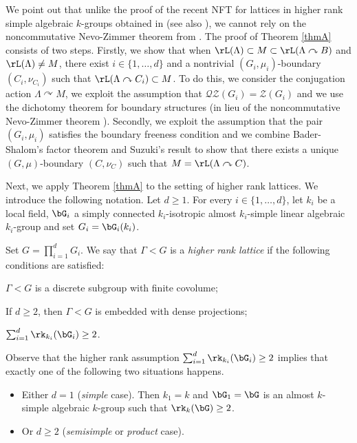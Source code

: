 We point out that unlike the proof of the recent NFT for lattices in higher rank simple algebraic $k$-groups obtained in \cite{BBH21} (see also \cite{Ho21}), we cannot rely on the noncommutative Nevo-Zimmer theorem from \cite{BH19, BBH21}. The proof of Theorem \ref{thmA} consists of two steps. Firstly, we show that when $\rL(\Lambda) \subset M \subset \rL(\Lambda \curvearrowright B)$ and $\rL(\Lambda) \neq M$, there exist $i \in \{1, \dots, d\}$ and a nontrivial $(G_i, \mu_i)$-boundary $(C_i, \nu_{C_i})$ such that $\rL(\Lambda \curvearrowright C_i) \subset M$. To do this, we consider the conjugation action $\Lambda \curvearrowright M$, we exploit the assumption that $\mathscr{Q}\mathscr{Z}(G_i) = \mathscr Z(G_i)$ and we use the dichotomy theorem for boundary structures \cite[Th.\,5.8]{BBHP20} (in lieu of the noncommutative Nevo-Zimmer theorem \cite{BH19, BBH21}). Secondly, we exploit the assumption that the pair $(G_i, \mu_i)$ satisfies the boundary freeness condition and we combine Bader-Shalom's factor theorem \cite{BS04} and Suzuki's result \cite{Su18} to show that there exists a unique $(G, \mu)$-boundary $(C, \nu_C)$ such that $M = \rL(\Lambda \curvearrowright C)$.

Next, we apply Theorem \ref{thmA} to the setting of higher rank lattices. We introduce the following notation. Let $d \geq 1$. For every $i \in \{1, \dots, d\}$, let $k_i$ be a local field, $\bG_i$ a simply connected $k_i$-isotropic almost $k_i$-simple linear algebraic $k_i$-group and set $G_i = \bG_i(k_i)$.

\begin{definition}
Set $G = \prod_{i = 1}^d G_i$. We say that $\Gamma < G$ is a \emph{higher rank lattice} if the following conditions are satisfied:
\begin{enumeratei}
\item
$\Gamma < G$ is a discrete subgroup with finite covolume;
\item
If $d \geq 2$, then $\Gamma < G$ is embedded with dense projections;
\item
$\sum_{i = 1}^d \rk_{k_i}(\bG_i) \geq 2$.
\end{enumeratei}
\end{definition}

Observe that the higher rank assumption $\sum_{i = 1}^d \rk_{k_i}(\bG_i) \geq 2$ implies that exactly one of the following two situations happens.
\begin{itemize}
\item Either $d = 1$ (\emph{simple} case). Then $k_1 = k$ and $\bG_1 = \bG$ is an almost $k$-simple algebraic $k$-group such that $\rk_k(\bG) \geq 2$.
\item Or $d \geq 2$ (\emph{semisimple} or \emph{product} case).
\end{itemize}

